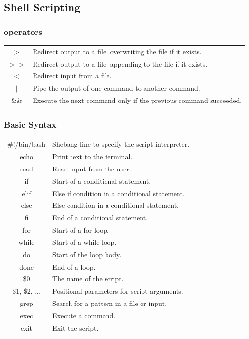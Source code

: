 \documentclass[10pt]{article}
\begin{document}
\begin{multicols}{2}
\subsection{Shell Scripting}
\subsubsection{operators}
\begin{tabular}{C L}
    $>$       & Redirect output to a file, overwriting the file if it exists. \\
    $>>$      & Redirect output to a file, appending to the file if it exists. \\
    $<$       & Redirect input from a file. \\
    $|$       & Pipe the output of one command to another command. \\
    \&\&      & Execute the next command only if the previous command succeeded. \\
\end{tabular}

\subsubsection{Basic Syntax}
\begin{tabular}{C L}
    \#!/bin/bash    & Shebang line to specify the script interpreter. \\
    echo            & Print text to the terminal. \\
    read            & Read input from the user. \\
    if              & Start of a conditional statement. \\
    elif            & Else if condition in a conditional statement. \\
    else            & Else condition in a conditional statement. \\
    fi              & End of a conditional statement. \\
    for             & Start of a for loop. \\
    while           & Start of a while loop. \\
    do              & Start of the loop body. \\
    done            & End of a loop. \\
    \$0             & The name of the script. \\
    \$1, \$2, ...   & Positional parameters for script arguments. \\
    grep            & Search for a pattern in a file or input. \\
    exec            & Execute a command. \\
    exit            & Exit the script. \\
\end{tabular}


\end{multicols}
\end{document}
